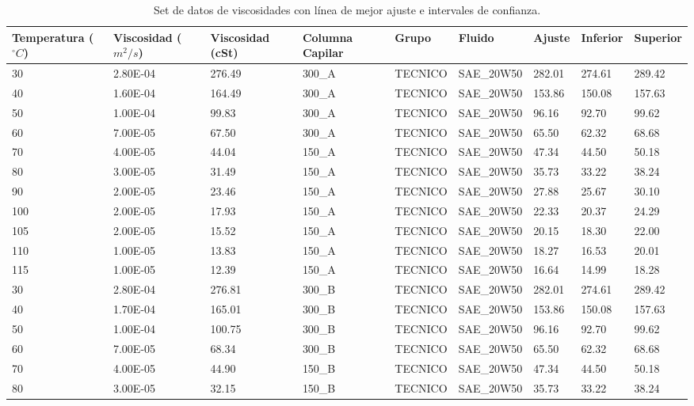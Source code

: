\documentclass[12, letterpaper]{article}
\begin{document}
\begin{table}[ht]
\centering
\caption{Set de datos de viscosidades con línea de mejor ajuste e intervales de confianza.}
\begin{tabular}{p{1.8cm}|p{1.5cm}p{1.5cm}p{1.5cm}p{1.5cm}p{2cm}p{1.2cm}p{1.2cm}p{1.2cm}}
  \hline
Temperatura ($^{\circ}C$) & Viscosidad ($m^{2}/s$) & Viscosidad (cSt) & Columna Capilar  & Grupo & Fluido & Ajuste & Inferior & Superior \\ 
  \hline
  30 & 2.80E-04 & 276.49 & 300\_A & TECNICO & SAE\_20W50 & 282.01 & 274.61 & 289.42 \\ 
  40 & 1.60E-04 & 164.49 & 300\_A & TECNICO & SAE\_20W50 & 153.86 & 150.08 & 157.63 \\ 
  50 & 1.00E-04 & 99.83 & 300\_A & TECNICO & SAE\_20W50 & 96.16 & 92.70 & 99.62 \\ 
  60 & 7.00E-05 & 67.50 & 300\_A & TECNICO & SAE\_20W50 & 65.50 & 62.32 & 68.68 \\ 
  70 & 4.00E-05 & 44.04 & 150\_A & TECNICO & SAE\_20W50 & 47.34 & 44.50 & 50.18 \\ 
  80 & 3.00E-05 & 31.49 & 150\_A & TECNICO & SAE\_20W50 & 35.73 & 33.22 & 38.24 \\ 
  90 & 2.00E-05 & 23.46 & 150\_A & TECNICO & SAE\_20W50 & 27.88 & 25.67 & 30.10 \\ 
  100 & 2.00E-05 & 17.93 & 150\_A & TECNICO & SAE\_20W50 & 22.33 & 20.37 & 24.29 \\ 
  105 & 2.00E-05 & 15.52 & 150\_A & TECNICO & SAE\_20W50 & 20.15 & 18.30 & 22.00 \\ 
  110 & 1.00E-05 & 13.83 & 150\_A & TECNICO & SAE\_20W50 & 18.27 & 16.53 & 20.01 \\ 
  115 & 1.00E-05 & 12.39 & 150\_A & TECNICO & SAE\_20W50 & 16.64 & 14.99 & 18.28 \\ 
  30 & 2.80E-04 & 276.81 & 300\_B & TECNICO & SAE\_20W50 & 282.01 & 274.61 & 289.42 \\ 
  40 & 1.70E-04 & 165.01 & 300\_B & TECNICO & SAE\_20W50 & 153.86 & 150.08 & 157.63 \\ 
  50 & 1.00E-04 & 100.75 & 300\_B & TECNICO & SAE\_20W50 & 96.16 & 92.70 & 99.62 \\ 
  60 & 7.00E-05 & 68.34 & 300\_B & TECNICO & SAE\_20W50 & 65.50 & 62.32 & 68.68 \\ 
  70 & 4.00E-05 & 44.90 & 150\_B & TECNICO & SAE\_20W50 & 47.34 & 44.50 & 50.18 \\ 
  80 & 3.00E-05 & 32.15 & 150\_B & TECNICO & SAE\_20W50 & 35.73 & 33.22 & 38.24 \\ 

\end{tabular}
\end{table}
\end{document}
